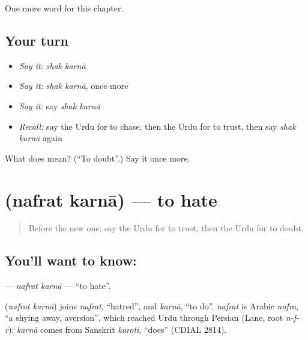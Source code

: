 \begin{grammarlens}[title={What you've built}]
One more word for this chapter.
\end{grammarlens}

\subsection*{Your turn}
\begin{itemize}
\raggedright
  \item \emph{Say it:} \emph{shak karnā}
  \item \emph{Say it:} \emph{shak karnā}, once more
  \item \emph{Say it:} say \emph{shak karnā}
  \item \emph{Recall:} say the Urdu for to chase, then the Urdu for to trust, then say \emph{shak karnā} again
\end{itemize}

\begin{tcolorbox}[breakable,colback=teal!4,colframe=teal!35!black,title={Before you move on}]
What does   mean? (\textquotedblleft{}To doubt\textquotedblright{}.) Say it once more.
\end{tcolorbox}
\section[\texorpdfstring{\ur{نفرت} \ur{کرنا} (nafrat karnā)}{نفرت کرنا (nafrat karnā)}]{  (nafrat karnā) — to hate}

\label{lesson:UR-C215-nafrat-karna}



\begin{quote}
Before the new one: say the Urdu for to trust, then the Urdu for to doubt.
\end{quote}

\subsection*{You'll want to know:  }
\textbf{ } — \emph{nafrat karnā} — \textquotedblleft{}to hate\textquotedblright{}.

\begin{cousinweb}
\textbf{ } (\emph{nafrat karnā}) joins \emph{nafrat}, \textquotedblleft{}hatred\textquotedblright{}, and \emph{karnā}, \textquotedblleft{}to do\textquotedblright{}. \emph{nafrat} is Arabic \emph{nafra}, \textquotedblleft{}a shying away, aversion\textquotedblright{}, which reached Urdu through Persian (Lane, root \emph{n-f-r}); \emph{karnā} comes from Sanskrit \emph{karoti}, \textquotedblleft{}does\textquotedblright{} (CDIAL 2814).
\end{cousinweb}

